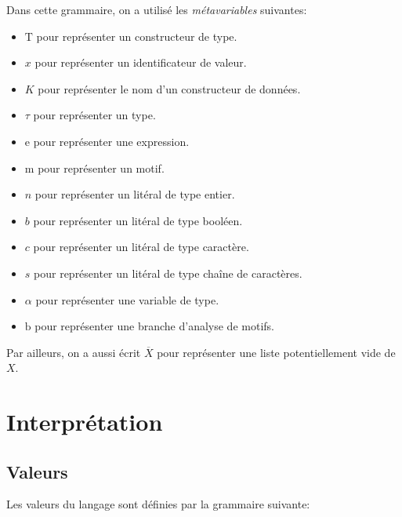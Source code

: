 \documentclass[a4paper,8pt]{article}
\newcommand\type{\tau}
\newcommand\meta[1]{\textrm{#1}}
\newcommand\expr{\meta{e}}
\newcommand\typecon{\meta{T}}
\newcommand\tvar{\alpha}
\newcommand\id{x}
\newcommand\cid{K}
\newcommand\lint{n}
\newcommand\lchar{c}
\newcommand\lbool{b}
\newcommand\lstring{s}
\newcommand\pattern{\meta{m}}
\newcommand\branch{\meta{b}}
\newcommand\many[1]{\overline{#1}}
\begin{document}
Dans cette grammaire, on a utilisé les \textit{métavariables} suivantes:
\begin{itemize}

\item $\typecon$ pour représenter un constructeur de type.

\item $\id$ pour représenter un identificateur de valeur.

\item $\cid$ pour représenter le nom d'un constructeur de données.

\item $\type$ pour représenter un type.

\item $\expr$ pour représenter une expression.

\item $\pattern$ pour représenter un motif.

\item $\lint$ pour représenter un litéral de type entier.

\item $\lbool$ pour représenter un litéral de type booléen.
  
\item $\lchar$ pour représenter un litéral de type caractère.

\item $\lstring$ pour représenter un litéral de type chaîne de caractères.

\item $\tvar$ pour représenter une variable de type.

\item $\branch$ pour représenter une branche d'analyse de motifs.
  
\end{itemize}

Par ailleurs, on a aussi écrit $\many{X}$ pour représenter une liste potentiellement vide de $X$.

\section{Interprétation}

\subsection{Valeurs}

Les valeurs du langage sont définies par la grammaire suivante:
\end{document}
